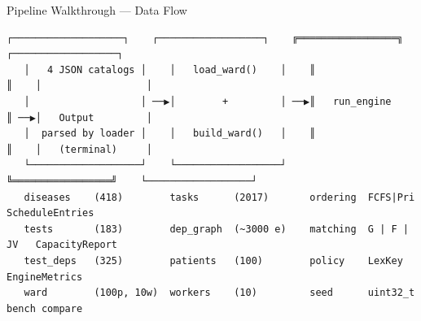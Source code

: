 \documentclass[aspectratio=169, 11pt]{beamer}
\begin{document}
\begin{frame}[fragile]{Pipeline Walkthrough --- Data Flow}
  \begin{center}
    \begin{tcolorbox}[enhanced, breakable=false,
                      colback=boxbg, colframe=ruleblue,
                      boxrule=0.4pt, arc=2pt,
                      left=4pt, right=4pt, top=2pt, bottom=2pt,
                      width=\dimexpr\textwidth+0.6cm\relax,
                      enlarge left by=-0.3cm]
\begin{Verbatim}[fontsize=\scriptsize]
   ┌───────────────────┐    ┌──────────────────┐    ╔═════════════════╗    ┌──────────────────┐
   │   4 JSON catalogs │    │   load_ward()    │    ║                 ║    │                  │
   │                   │ ──▶│        +         │ ──▶║   run_engine    ║ ──▶│   Output         │
   │  parsed by loader │    │   build_ward()   │    ║                 ║    │   (terminal)     │
   └───────────────────┘    └──────────────────┘    ╚═════════════════╝    └──────────────────┘
   diseases    (418)        tasks      (2017)       ordering  FCFS|Pri     ScheduleEntries
   tests       (183)        dep_graph  (~3000 e)    matching  G | F | JV   CapacityReport
   test_deps   (325)        patients   (100)        policy    LexKey       EngineMetrics
   ward        (100p, 10w)  workers    (10)         seed      uint32_t     bench compare
\end{Verbatim}
    \end{tcolorbox}
  \end{center}
\end{frame}
\end{document}
